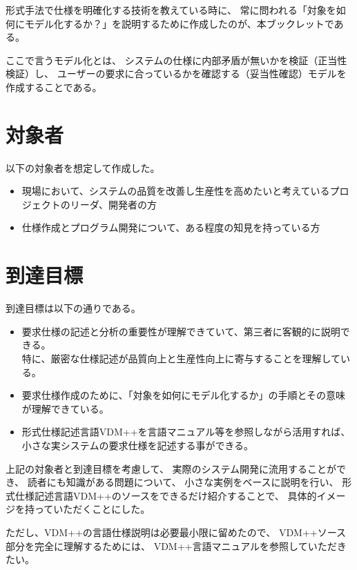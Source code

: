 形式手法で仕様を明確化する技術を教えている時に、
常に問われる「対象を如何にモデル化するか？」を説明するために作成したのが、本ブックレットである。

ここで言うモデル化とは、
システムの仕様に内部矛盾が無いかを検証（正当性検証）し、
ユーザーの要求に合っているかを確認する（妥当性確認）モデルを作成することである。

\section {対象者}
	以下の対象者を想定して作成した。

	\begin{itemize}
	\item 現場において、システムの品質を改善し生産性を高めたいと考えているプロジェクトのリーダ、開発者の方
	\item 仕様作成とプログラム開発について、ある程度の知見を持っている方 
	\end{itemize}

\section {到達目標}

	到達目標は以下の通りである。

	\begin{itemize}
	\item 要求仕様の記述と分析の重要性が理解できていて、第三者に客観的に説明できる。 \\
		特に、厳密な仕様記述が品質向上と生産性向上に寄与することを理解している。
	\item 要求仕様作成のために、「対象を如何にモデル化するか」の手順とその意味が理解できている。
	\item 形式仕様記述言語VDM++を言語マニュアル\cite{SCSK2012PP}等を参照しながら活用すれば、 \\
		小さな実システムの要求仕様を記述する事ができる。
	\end{itemize}

	上記の対象者と到達目標を考慮して、
	実際のシステム開発に流用することができ、
	読者にも知識がある問題について、
	小さな実例をベースに説明を行い、
	形式仕様記述言語VDM++のソースをできるだけ紹介することで、
	具体的イメージを持っていただくことにした。

	ただし、VDM++の言語仕様説明は必要最小限に留めたので、
	VDM++ソース部分を完全に理解するためには、
	VDM++言語マニュアル\cite{SCSK2012PP}を参照していただきたい。

